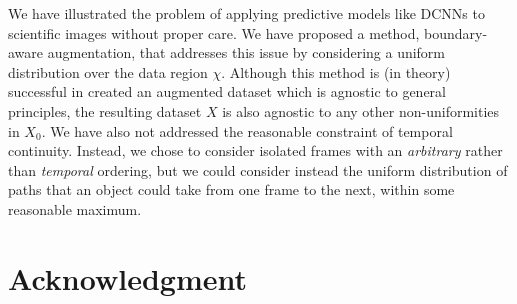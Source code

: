 \documentclass[10pt, draftcls]{IEEEtran}
\begin{document}
We have illustrated the problem of applying predictive models like DCNNs to
scientific images without proper care. We have proposed a method, boundary-aware
augmentation, that addresses this issue by considering a uniform distribution
over the data region $\chi$. Although this method is (in theory) successful in
created an augmented dataset which is agnostic to general principles, the
resulting dataset $X$ is also agnostic to any other non-uniformities in
$X_0$. We have also not addressed the reasonable constraint of temporal
continuity. Instead, we chose to consider isolated frames with an
\emph{arbitrary} rather than \emph{temporal} ordering, but we could consider
instead the uniform distribution of paths that an object could take from one
frame to the next, within some reasonable maximum.




\section*{Acknowledgment}
\label{sec:acknowledgment}



\end{document}
